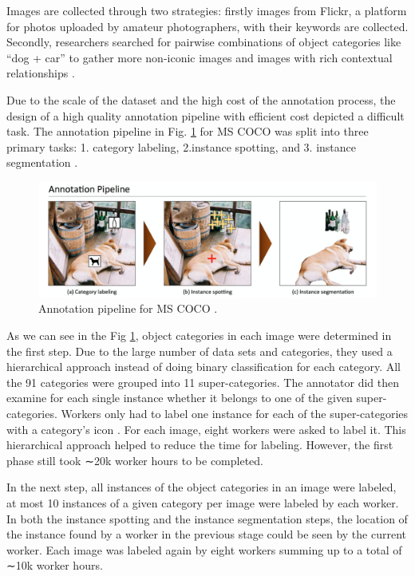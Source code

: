 \documentclass[
]{krantz}
\begin{document}
Images are collected through two strategies: firstly images from Flickr, a platform for photos uploaded by amateur photographers, with their keywords are collected. Secondly, researchers searched for pairwise combinations of object categories like ``dog + car'' to gather more non-iconic images and images with rich contextual relationships \citep{mccoco}.

Due to the scale of the dataset and the high cost of the annotation process, the design of a high quality annotation pipeline with efficient cost depicted a difficult task. The annotation pipeline in Fig. \ref{fig:cocoannotation} for MS COCO was split into three primary tasks: 1. category labeling, 2.instance spotting, and 3. instance segmentation \citep{mccoco}.

\begin{figure}

{\centering \includegraphics[width=1\linewidth]{figures/02-01/2.1 annotation pipeline} 

}

\caption{Annotation pipeline for MS COCO \citep{mccoco}.}\label{fig:cocoannotation}
\end{figure}



As we can see in the Fig \ref{fig:cocoannotation}, object categories in each image were determined in the first step. Due to the large number of data sets and categories, they used a hierarchical approach instead of doing binary classification for each category. All the 91 categories were grouped into 11 super-categories. The annotator did then examine for each single instance whether it belongs to one of the given super-categories.
Workers only had to label one instance for each of the super-categories with a category's icon \citep{mccoco}. For each image, eight workers were asked to label it. This hierarchical approach helped to reduce the time for labeling. However, the first phase still took ∼20k worker hours to be completed.

In the next step, all instances of the object categories in an image were labeled, at most 10 instances of a given category per image were labeled by each worker. In both the instance spotting and the instance segmentation steps, the location of the instance found by a worker in the previous stage could be seen by the current worker. Each image was labeled again by eight workers summing up to a total of ∼10k worker hours.
\end{document}
